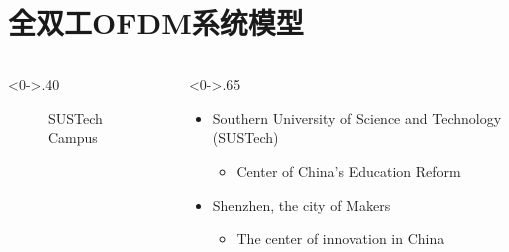 \section{全双工OFDM系统模型}

    \begin{frame}
    \begin{columns}[T] %
    	\begin{column}<0->{.40\textwidth}
    		\begin{figure}[thpb]
    			\centering
    			\caption{SUSTech Campus}
    			\label{fig:campus}
    		\end{figure}
    	\end{column}%
    	\hfill%
    	\begin{column}<0->{.65\textwidth}
    		\begin{itemize}
    			\item Southern University of Science and Technology (SUSTech)
    			\begin{itemize}
    				\item Center of China's Education Reform
    			\end{itemize}
    			\item Shenzhen, the city of Makers
    			\begin{itemize}
    				\item The center of innovation in China
    			\end{itemize}
    		\end{itemize}
    	\end{column}%
    \end{columns}
\end{frame}